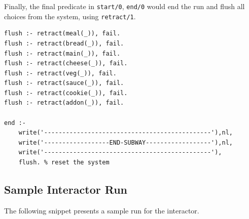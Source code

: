 \documentclass[11pt]{report}
\begin{document}
Finally, the final predicate in \texttt{start/0}, \texttt{end/0} would end the run
and flush all choices from the system, using \texttt{retract/1}.

\begin{lstlisting}
flush :- retract(meal(_)), fail.
flush :- retract(bread(_)), fail.
flush :- retract(main(_)), fail.
flush :- retract(cheese(_)), fail.
flush :- retract(veg(_)), fail.
flush :- retract(sauce(_)), fail.
flush :- retract(cookie(_)), fail.
flush :- retract(addon(_)), fail.

end :-
    write('----------------------------------------------'),nl,
    write('------------------END-SUBWAY------------------'),nl,
    write('----------------------------------------------'),
    flush. % reset the system
\end{lstlisting}

\subsection*{Sample Interactor Run}

The following snippet presents a sample run for the interactor.
\end{document}
